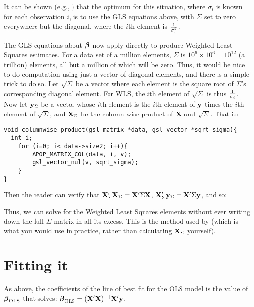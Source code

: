 It can be shown (e.g., \citet{kmenta}) that the optimum for this
situation, where $\sigma_i$ is known for each observation $i$, is to use
the GLS equations above, with $\Sigma$ set to zero everywhere but the
diagonal, where the $i$th element is $1\over {\sigma_i^2}$.

The GLS equations about ${\mbox{\boldmath$\beta$}}$ now apply directly to produce Weighted 
Least Squares estimates. For a data set of a million elements,
$\Sigma$ is $10^6 \times 10^6=10^{12}$ (a trillion) elements, all but a
million of which will be zero. Thus, it would be nice to do computation
using just a vector of diagonal elements, and there is a simple trick to
do so. Let $\sqrt\Sigma$ be a vector where each element is the square
root of $\Sigma$'s corresponding diagonal element. For WLS, the $i$th
element of $\sqrt\Sigma$ is thus $1\over {\sigma_i}$. Now let
${\bf y}_\Sigma$ be a vector whose $i$th element 
is the $i$th element of ${\bf y}$ times the $i$th element of
$\sqrt\Sigma$, and 
${\bf X}_\Sigma$ be the column-wise product of ${\bf X}$ and
$\sqrt\Sigma$. That is:
\begin{lstlisting}
void columnwise_product(gsl_matrix *data, gsl_vector *sqrt_sigma){
  int i;
    for (i=0; i< data->size2; i++){
        APOP_MATRIX_COL(data, i, v);
        gsl_vector_mul(v, sqrt_sigma);
    }
}
\end{lstlisting}
Then the reader can verify that 
${\bf X}_\Sigma'{\bf X}_\Sigma = {\bf X}' \Sigma {\bf X}$, 
${\bf X}_\Sigma'{\bf y}_\Sigma = {\bf X}' \Sigma {\bf y}$, and so:


Thus, we can solve for the Weighted Least Squares elements without ever
writing down the full $\Sigma$ matrix in all its excess. This is the
method used by  (which is what you would use in
practice, rather than calculating ${\bf X}_\Sigma$ yourself).

\section{Fitting it} 
As above,
the coefficients of  the line of best fit for the OLS model is the value of ${\mbox{\boldmath$\beta$}}_{\rm OLS}$ that solves:
$ {\mbox{\boldmath$\beta$}}_{\rm OLS} = ({\bf X}'{\bf X})^{-1}{\bf X}'{\bf y}$.


